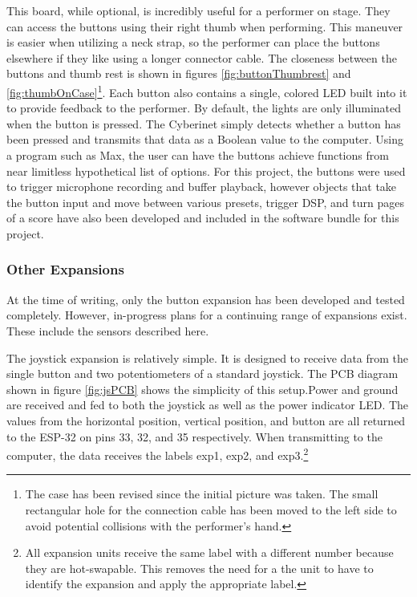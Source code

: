 This board, while optional, is incredibly useful for a performer on stage. They can access the buttons using their right thumb when performing. This maneuver is easier when utilizing a neck strap, so the performer can place the buttons elsewhere if they like using a longer connector cable. The closeness between the buttons and thumb rest is shown in figures \ref{fig:buttonThumbrest} and \ref{fig:thumbOnCase}\footnote{The case has been revised since the initial picture was taken. The small rectangular hole for the connection cable has been moved to the left side to avoid potential collisions with the performer's hand.}. Each button also contains a single, colored LED built into it to provide feedback to the performer. By default, the lights are only illuminated when the button is pressed. The Cyberinet simply detects whether a button has been pressed and transmits that data as a Boolean value to the computer. Using a program such as Max, the user can have the buttons achieve functions from near limitless hypothetical list of options. For this project, the buttons were used to trigger microphone recording and buffer playback, however objects that take the button input and move between various presets, trigger DSP, and turn pages of a score have also been developed and included in the software bundle for this project.

\subsubsection{Other Expansions}
At the time of writing, only the button expansion has been developed and tested completely. However, in-progress plans for a continuing range of expansions exist. These include the sensors described here.

The joystick expansion is relatively simple. It is designed to receive data from the single button and two potentiometers of a standard joystick. The PCB diagram shown in figure \ref{fig:jsPCB} shows the simplicity of this setup.Power and ground are received and fed to both the joystick as well as the power indicator LED. The values from the horizontal position, vertical position, and button are all returned to the ESP-32 on pins 33, 32, and 35 respectively. When transmitting to the computer, the data receives the labels exp1, exp2, and exp3.\footnote{All expansion units receive the same label with a different number because they are hot-swapable. This removes the need for a the unit to have to identify the expansion and apply the appropriate label.}

